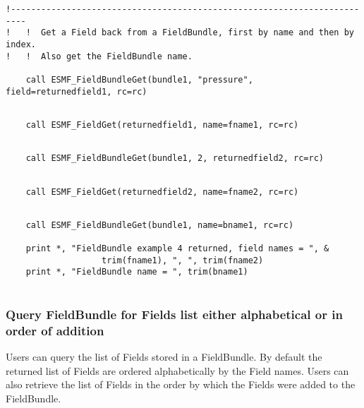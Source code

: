  \begin{verbatim}
!-------------------------------------------------------------------------
!   !  Get a Field back from a FieldBundle, first by name and then by index.
!   !  Also get the FieldBundle name.

    call ESMF_FieldBundleGet(bundle1, "pressure", field=returnedfield1, rc=rc)
 
\end{verbatim}
 

 \begin{verbatim}
    call ESMF_FieldGet(returnedfield1, name=fname1, rc=rc)
 
\end{verbatim}
 

 \begin{verbatim}
    call ESMF_FieldBundleGet(bundle1, 2, returnedfield2, rc=rc)
 
\end{verbatim}
 

 \begin{verbatim}
    call ESMF_FieldGet(returnedfield2, name=fname2, rc=rc)
 
\end{verbatim}
 

 \begin{verbatim}
    call ESMF_FieldBundleGet(bundle1, name=bname1, rc=rc)

    print *, "FieldBundle example 4 returned, field names = ", &
                   trim(fname1), ", ", trim(fname2)
    print *, "FieldBundle name = ", trim(bname1)
 
\end{verbatim}
 

   \subsubsection{Query FieldBundle for Fields list either alphabetical or in order of addition}
   \label{sec:fieldbundle:usage:getlist}
   Users can query the list of Fields stored in a FieldBundle.
   By default the returned list of Fields are ordered alphabetically by
   the Field names. Users can also retrieve the list of Fields in the order by which
   the Fields were added to the FieldBundle. 

